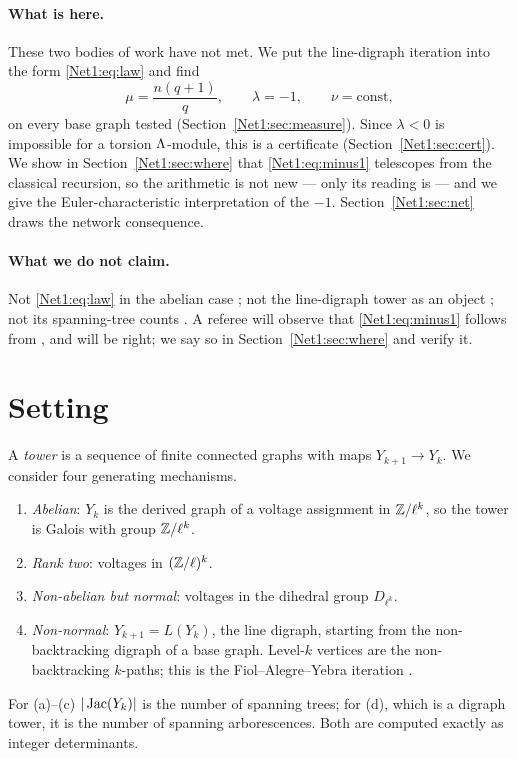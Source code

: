\paragraph{What is here.}
These two bodies of work have not met. We put the line-digraph iteration into the form
\eqref{Net1:eq:law} and find
\begin{equation}\label{Net1:eq:minus1}
\mu=\frac{n(q+1)}{q},\qquad \lambda=-1,\qquad \nu=\text{const},
\end{equation}
on every base graph tested (Section~\ref{Net1:sec:measure}). Since $\lambda<0$ is impossible for
a torsion $\Lambda$-module, this is a certificate (Section~\ref{Net1:sec:cert}). We show in
Section~\ref{Net1:sec:where} that \eqref{Net1:eq:minus1} telescopes from the classical recursion, so
the arithmetic is not new --- only its reading is --- and we give the Euler-characteristic
interpretation of the $-1$. Section~\ref{Net1:sec:net} draws the network consequence.

\paragraph{What we do not claim.}
Not \eqref{Net1:eq:law} in the abelian case \cite{Val21,MV24,Gonet22}; not the line-digraph
tower as an object \cite{FAY83,FYA84}; not its spanning-tree counts
\cite{Knuth67,Levine11,BK11,CHP15}. A referee will observe that \eqref{Net1:eq:minus1} follows
from \cite{Knuth67,Levine11}, and will be right; we say so in Section~\ref{Net1:sec:where} and
verify it.

\section{Setting}\label{Net1:sec:setting}

A \emph{tower} is a sequence of finite connected graphs with maps
$Y_{k+1}\to Y_k$. We consider four generating mechanisms.
\begin{enumerate}
\item[(a)] \emph{Abelian}: $Y_k$ is the derived graph of a voltage assignment in
$\mathbb{Z}/\ell^{k}$, so the tower is Galois with group $\mathbb{Z}/\ell^{k}$.
\item[(b)] \emph{Rank two}: voltages in $(\mathbb{Z}/\ell)^{k}$.
\item[(c)] \emph{Non-abelian but normal}: voltages in the dihedral group $D_{\ell^{k}}$.
\item[(d)] \emph{Non-normal}: $Y_{k+1}=L(Y_k)$, the line digraph, starting from the
non-backtracking digraph of a base graph. Level-$k$ vertices are the non-backtracking
$k$-paths; this is the Fiol--Alegre--Yebra iteration \cite{FAY83}.
\end{enumerate}
For (a)--(c) $|\operatorname{Jac}(Y_k)|$ is the number of spanning trees; for (d), which is a digraph
tower, it is the number of spanning arborescences. Both are computed exactly as integer
determinants.

